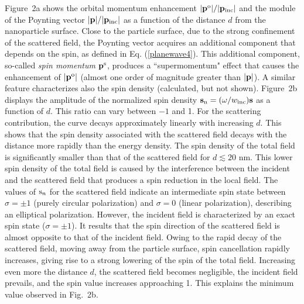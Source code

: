 \documentclass[journal=apchd5,manuscript=article]{achemso}
\begin{document}
Figure~2a shows the orbital momentum enhancement $|{\bf p}^{\rm o}|/|{\bf p_{\rm inc}}|$ and the module of the Poynting vector $|{\bf p}|/|{\bf p_{\rm inc}}|$ as a function of the distance $d$ from the nanoparticle surface. Close to the particle surface, due to the strong confinement of the scattered field, the Poynting vector acquires an additional component that depends on the spin, as defined in Eq. (\ref{planewave4}). This additional component, so-called \textit{spin momentum} ${\bf p}^{\rm s}$, produces a ``supermomentum" effect that causes the enhancement of $|{\bf p}^{\rm o}|$ (almost one order of magnitude greater than $|{\bf p}|$).
A similar feature characterizes also the spin density (calculated, but not shown). Figure~2b displays the amplitude of the normalized spin density ${\bf s}_{\rm n} = (\omega/ w_{\rm inc}) {\bf s}$ as a function of $d$. This ratio can vary between $-1$ and 1. For the scattering contribution, the curve decays approximately linearly with increasing $d$. This shows that the spin density associated with the scattered field decays with the distance more rapidly than the energy density. The spin density of the total field is significantly smaller than that of the scattered field for $d \lesssim 20$ nm. This lower spin density of the total field is caused by the interference between the incident and the scattered field that produces a spin reduction in the local field. The values of ${\rm s}_{n}$ for the scattered field indicate an intermediate spin state  between $\sigma = \pm 1$ (purely circular polarization) and $\sigma = 0$ (linear polarization), describing an elliptical polarization. However, the incident field is characterized by an exact spin state ($\sigma= \pm 1$). It results that the spin direction of the scattered field is almost opposite to that of the incident field. Owing to the rapid decay of the scattered field, moving away from the particle surface, spin cancellation rapidly increases, giving rise to a strong lowering of the spin of the total field. Increasing even more the distance $d$, the scattered field becomes negligible, the incident field prevails, and the spin value increases approaching 1. This explains the minimum value observed in Fig.~2b. 
\end{document}
